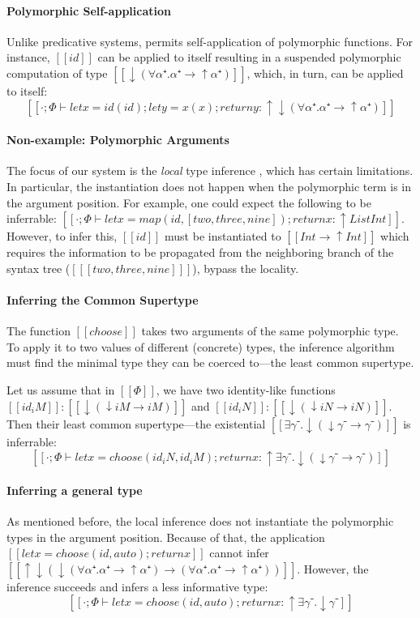\paragraph*{Polymorphic Self-application}
  Unlike predicative systems, \fexists permits self-application of polymorphic
  functions. For instance, $[[id]]$ can be applied to itself resulting in a
  suspended polymorphic computation of type $[[↓(∀α⁺.α⁺ → ↑α⁺)]]$, which, in
  turn, can be applied to itself:
  $$[[· ; Φ ⊢ let x = id(id); let y = x(x); return y : ↑↓(∀α⁺.α⁺ → ↑α⁺)]]$$


\paragraph*{Non-example: Polymorphic Arguments}
The focus of our system is the \emph{local} type inference
\cite{pierce2000:local}, which has certain limitations. In particular, the
instantiation does not happen when the polymorphic term is in the argument
position. For example, one could expect the following to be inferrable:
\mbox{$[[· ; Φ ⊢ let x = map(id, [two, three, nine]); return x : ↑ List Int]]$}.
However, to infer this, $[[id]]$ must be instantiated to \mbox{$[[Int → ↑Int]]$}
which requires the information to be propagated from the neighboring branch of
the syntax tree (\mbox{$[[ [two, three, nine] ]]$}), \ie bypass the locality. 


\paragraph*{Inferring the Common Supertype}
  The function $[[choose]]$ takes two arguments of the same
  polymorphic type. To apply it to two values of different (concrete) types, 
  the inference algorithm must find the minimal type they can be coerced 
  to---the least common supertype.

  Let us assume that in $[[Φ]]$, we have two identity-like functions 
  \mbox{$[[id_iM]] : [[↓(↓iM → iM)]]$} and \mbox{$[[id_iN]] : [[↓(↓iN → iN)]]$}.
  Then their least common supertype---the existential $[[∃γ⁻.↓(↓γ⁻ → γ⁻)]]$
  is inferrable:
  $$[[· ; Φ ⊢ let x = choose (id_iN, id_iM); return x : ↑ ∃γ⁻.↓(↓γ⁻ → γ⁻)]]$$

\paragraph*{Inferring a general type}
  As mentioned before, the local inference does not instantiate the polymorphic
  types in the argument position.
  Because of that, the application 
  \mbox{$[[let x = choose (id, auto); return x ]]$} cannot infer 
  $[[↑↓(↓(∀α⁺.α⁺ → ↑α⁺) → (∀α⁺.α⁺ → ↑α⁺))]]$.
  However, the inference succeeds and infers a less informative type:
  $$[[· ; Φ ⊢ let x = choose (id, auto); return x : ↑ ∃γ⁻.↓γ⁻]]$$

